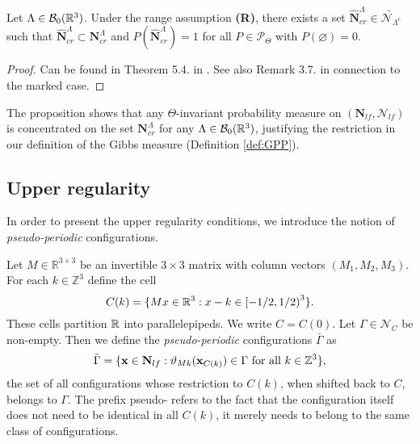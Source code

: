 \begin{proposition}\label{prop:cr-a.s.}
	Let $\Lambda \in \mathcal B_0({\mathbb R^3})$. Under the range assumption \textbf{(R)}, there exists a set $\hat {\mathbf N}^\Lambda_{cr} \in \tilde {\mathcal N_{\Lambda^c}}$ such that $\hat {\mathbf N}^\Lambda_{cr} \subset \mathbf N^\Lambda_{cr}$ and $P(\hat {\mathbf N}^\Lambda_{cr})=1$ for all $P \in \mathcal P_\Theta$ with $P(\varnothing)=0$.
\end{proposition}
\begin{proof}
	Can be found in Theorem 5.4. in \cite{DDG12}. See also Remark 3.7. in connection to the marked case.
\end{proof}

The proposition shows that any $\Theta$-invariant probability measure on $(\mathbf N_{lf},\mathcal N_{lf})$ is concentrated on the set $\mathbf N^\Lambda_{cr}$ for any $\Lambda \in \mathcal B_0({\mathbb R^3})$, justifying the restriction in our definition of the Gibbs measure (Definition \ref{def:GPP}).  

\subsection{Upper regularity}\label{sec:upperregularity}


In order to present the upper regularity conditions, we introduce the notion of \textit{pseudo-periodic} configurations. 

Let $M\in\mathbb R^{3\times 3}$ be an invertible $3\times 3$ matrix with column vectors $(M_1,M_2,M_3)$. For each $k \in \mathbb Z^3$ define the cell
$$C(k) =  \{Mx \in {\mathbb R^3}: x-k \in \left[ -1/2, 1/2 \right)^3 \}.$$
These cells partition $\mathbb{R}$ into parallelepipeds. We write $C=C(0)$. Let $\Gamma \in \mathcal N_C$ be non-empty. Then we define the \textit{pseudo-periodic} configurations $\bar \Gamma$ as
$$\bar \Gamma = \{ {\mathbf{x}} \in \mathbf N_{lf}: \vartheta_{Mk}({\mathbf{x}}_{C(k)}) \in \Gamma \text{ for all } k \in \mathbb Z^3 \},$$
the set of all configurations whose restriction to $C(k)$, when shifted back to $C$, belongs to $\Gamma$. The prefix pseudo- refers to the fact that the configuration itself does not need to be identical in all $C(k)$, it merely needs to belong to the same class of configurations.

